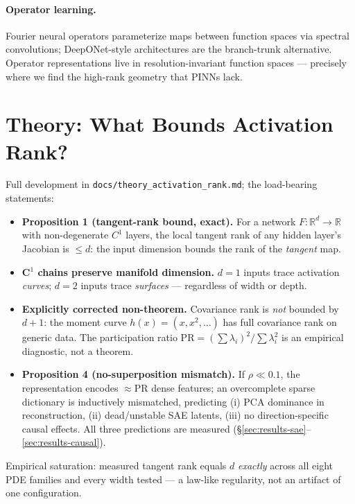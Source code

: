 \documentclass{article}
\newcommand{\PRW}{\rho}
\begin{document}
\paragraph{Operator learning.} Fourier neural operators
\cite{li2021fourier} parameterize maps between function spaces via spectral
convolutions; DeepONet-style architectures \cite{lu2021learning} are the
branch-trunk alternative. Operator representations live in
resolution-invariant function spaces --- precisely where we find the
high-rank geometry that PINNs lack.

\section{Theory: What Bounds Activation Rank?}
\label{sec:theory}

Full development in \texttt{docs/theory\_activation\_rank.md}; the load-bearing
statements:

\begin{itemize}
  \item \textbf{Proposition 1 (tangent-rank bound, exact).} For a network
        $F:\mathbb{R}^d\!\to\!\mathbb{R}$ with non-degenerate $C^1$ layers,
        the local tangent rank of any hidden layer's Jacobian is $\le d$:
        the input dimension bounds the rank of the \emph{tangent} map.
  \item \textbf{C$^1$ chains preserve manifold dimension.} $d{=}1$ inputs
        trace activation \emph{curves}; $d{=}2$ inputs trace \emph{surfaces}
        --- regardless of width or depth.
  \item \textbf{Explicitly corrected non-theorem.} Covariance rank is
        \emph{not} bounded by $d+1$: the moment curve
        $h(x) = (x, x^2, \dots)$ has full covariance rank on generic data.
        The participation ratio $\mathrm{PR} = (\sum\lambda_i)^2/\sum\lambda_i^2$
        is an empirical diagnostic, not a theorem.
  \item \textbf{Proposition 4 (no-superposition mismatch).} If
        $\PRW \ll 0.1$, the representation encodes $\approx \mathrm{PR}$
        dense features; an overcomplete sparse dictionary is inductively
        mismatched, predicting (i) PCA dominance in reconstruction,
        (ii) dead/unstable SAE latents, (iii) no direction-specific causal
        effects. All three predictions are measured
        (\S\ref{sec:results-sae}--\ref{sec:results-causal}).
\end{itemize}

Empirical saturation: measured tangent rank equals $d$ \emph{exactly} across
all eight PDE families and every width tested --- a law-like regularity, not
an artifact of one configuration.
\end{document}
